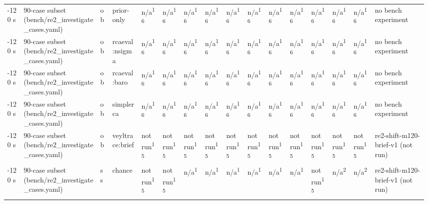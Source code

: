 \begin{table}[t]
\begin{tabular}{llllllllllllllll}
-120 s & 90-case subset (bench/re2\_investigate\_cases.yaml) & ob & prior-only & n/a\textsuperscript{16} & n/a\textsuperscript{16} & n/a\textsuperscript{16} & n/a\textsuperscript{16} & n/a\textsuperscript{16} & n/a\textsuperscript{16} & n/a\textsuperscript{16} & n/a\textsuperscript{16} & n/a\textsuperscript{16} & n/a\textsuperscript{16} & n/a\textsuperscript{16} & no bench experiment \\
-120 s & 90-case subset (bench/re2\_investigate\_cases.yaml) & ob & rcaeval:nsigma & n/a\textsuperscript{16} & n/a\textsuperscript{16} & n/a\textsuperscript{16} & n/a\textsuperscript{16} & n/a\textsuperscript{16} & n/a\textsuperscript{16} & n/a\textsuperscript{16} & n/a\textsuperscript{16} & n/a\textsuperscript{16} & n/a\textsuperscript{16} & n/a\textsuperscript{16} & no bench experiment \\
-120 s & 90-case subset (bench/re2\_investigate\_cases.yaml) & ob & rcaeval:baro & n/a\textsuperscript{16} & n/a\textsuperscript{16} & n/a\textsuperscript{16} & n/a\textsuperscript{16} & n/a\textsuperscript{16} & n/a\textsuperscript{16} & n/a\textsuperscript{16} & n/a\textsuperscript{16} & n/a\textsuperscript{16} & n/a\textsuperscript{16} & n/a\textsuperscript{16} & no bench experiment \\
-120 s & 90-case subset (bench/re2\_investigate\_cases.yaml) & ob & simplerca & n/a\textsuperscript{16} & n/a\textsuperscript{16} & n/a\textsuperscript{16} & n/a\textsuperscript{16} & n/a\textsuperscript{16} & n/a\textsuperscript{16} & n/a\textsuperscript{16} & n/a\textsuperscript{16} & n/a\textsuperscript{16} & n/a\textsuperscript{16} & n/a\textsuperscript{16} & no bench experiment \\
-120 s & 90-case subset (bench/re2\_investigate\_cases.yaml) & ob & veyltrace:brief & not run\textsuperscript{15} & not run\textsuperscript{15} & not run\textsuperscript{15} & not run\textsuperscript{15} & not run\textsuperscript{15} & not run\textsuperscript{15} & not run\textsuperscript{15} & not run\textsuperscript{15} & not run\textsuperscript{15} & not run\textsuperscript{15} & not run\textsuperscript{15} & re2-shift-m120-brief-v1 (not run) \\
-120 s & 90-case subset (bench/re2\_investigate\_cases.yaml) & ss & chance & not run\textsuperscript{15} & not run\textsuperscript{15} & n/a\textsuperscript{1} & n/a\textsuperscript{1} & n/a\textsuperscript{1} & n/a\textsuperscript{1} & n/a\textsuperscript{1} & n/a\textsuperscript{1} & not run\textsuperscript{15} & n/a\textsuperscript{2} & n/a\textsuperscript{2} & re2-shift-m120-brief-v1 (not run) \\

\end{tabular}
\end{table}
